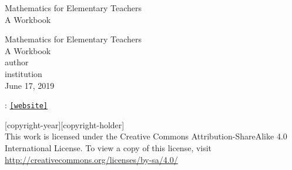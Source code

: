 \documentclass[twoside,11pt,]{book}
\newcommand{\mono}[1]{\texttt{#1}}
\begin{document}
\frontmatter
\thispagestyle{empty}
{\centering
\vspace*{0.28\textheight}
{\Huge Mathematics for Elementary Teachers}\\[2\baselineskip]
{\LARGE A Workbook}\\
}
\clearpage
\thispagestyle{empty}
\null%
\clearpage
\thispagestyle{empty}
{\centering
\vspace*{0.14\textheight}
{\Huge Mathematics for Elementary Teachers}\\[\baselineskip]
{\LARGE A Workbook}\\[3\baselineskip]
{\Large \textbraceleft{}author\textbraceright{}}\\[0.5\baselineskip]
{\Large \textbraceleft{}institution\textbraceright{}}\\[3\baselineskip]
{\Large June 17, 2019}\\}
\clearpage
\thispagestyle{empty}
\hypertarget{colophon-1}{}
: \href{[website]}{\mono{[website]}}\par\medskip
\noindent\textcopyright{}[copyright-year]\quad{}[copyright-holder]\\[0.5\baselineskip]
 This work is licensed under the Creative Commons Attribution-ShareAlike 4.0 International License. To view a copy of this license, visit \href{http://creativecommons.org/licenses/by-sa/4.0/}{http:\slash{}\slash{}creativecommons.org\slash{}licenses\slash{}by-sa\slash{}4.0\slash{}}\par\medskip
{}
\null\clearpage
\setcounter{tocdepth}{2}
\renewcommand*\contentsname{Contents}
\tableofcontents
\mainmatter
%
%
\typeout{************************************************}
\typeout{************************************************}
%
\end{document}
